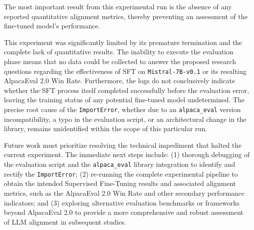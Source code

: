 \documentclass[11pt]{article}
\begin{document}
The most important result from this experimental run is the absence of any reported quantitative alignment metrics, thereby preventing an assessment of the fine-tuned model's performance.

This experiment was significantly limited by its premature termination and the complete lack of quantitative results. The inability to execute the evaluation phase means that no data could be collected to answer the proposed research questions regarding the effectiveness of SFT on \texttt{{Mistral-7B-v0.1}} or its resulting AlpacaEval 2.0 Win Rate. Furthermore, the logs do not conclusively indicate whether the SFT process itself completed successfully before the evaluation error, leaving the training status of any potential fine-tuned model undetermined. The precise root cause of the \texttt{{ImportError}}, whether due to an \texttt{{alpaca\_eval}} version incompatibility, a typo in the evaluation script, or an architectural change in the library, remains unidentified within the scope of this particular run.

Future work must prioritize resolving the technical impediment that halted the current experiment. The immediate next steps include: (1) thorough debugging of the evaluation script and the \texttt{{alpaca\_eval}} library integration to identify and rectify the \texttt{{ImportError}}; (2) re-running the complete experimental pipeline to obtain the intended Supervised Fine-Tuning results and associated alignment metrics, such as the AlpacaEval 2.0 Win Rate and other secondary performance indicators; and (3) exploring alternative evaluation benchmarks or frameworks beyond AlpacaEval 2.0 to provide a more comprehensive and robust assessment of LLM alignment in subsequent studies.
\end{document}

